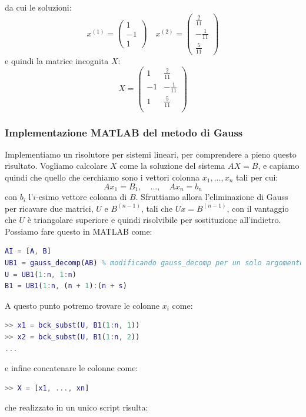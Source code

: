 \documentclass[a4paper,11pt]{article}
\begin{document}
da cui le soluzioni:
$$
x^{(1)} = \begin{pmatrix}
	1 \\ -1 \\ 1
\end{pmatrix} \quad 
x^{(2)} = \begin{pmatrix}
	\frac{2}{11} \\ -\frac{1}{11} \\ \frac{5}{11}
\end{pmatrix}
$$
e quindi la matrice incognita $X$:
$$
X = \begin{pmatrix}
	1 & \frac{2}{11} \\
	-1 & -\frac{1}{11} \\
	1 & \frac{5}{11} \\
\end{pmatrix}
$$


\subsubsection{Implementazione MATLAB del metodo di Gauss}
Implementiamo un risolutore per sistemi lineari, per comprendere a pieno questo risultato.
Vogliamo calcolare $X$ come la soluzione del sistema $AX = B$, e capiamo quindi che quello che cerchiamo sono i vettori colonna $x_1, ..., x_n$ tali per cui:
$$
A x_1 = B_1, \quad ..., \quad A x_n = b_n
$$
con $b_i$ l'$i$-esimo vettore colonna di $B$.
Sfruttiamo allora l'eliminazione di Gauss per ricavare due matrici, $U$ e $B^{(n - 1)}$, tali che $Ux = B^{(n - 1)}$, con il vantaggio che $U$ è triangolare superiore e quindi risolvibile per sostituzione all'indietro.
Possiamo fare questo in MATLAB come:
\begin{lstlisting}[language=matlab, style=codestyle]	
AI = [A, B]
UB1 = gauss_decomp(AB) % modificando gauss_decomp per un solo argomento 
U = UB1(1:n, 1:n)
B1 = UB1(1:n, (n + 1):(n + s)
\end{lstlisting}

A questo punto potremo trovare le colonne $x_i$ come:
\begin{lstlisting}[language=matlab, style=codestyle]	
>> x1 = bck_subst(U, B1(1:n, 1))
>> x2 = bck_subst(U, B1(1:n, 2))
...
\end{lstlisting}
e infine concatenare le colonne come:
\begin{lstlisting}[language=matlab, style=codestyle]	
>> X = [x1, ..., xn]
\end{lstlisting}
che realizzato in un unico script risulta:

\end{document}
